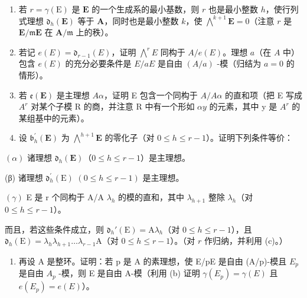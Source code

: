 \begin{enumerate}
\def\labelenumi{(\alph{enumi})}
\item
  若 \(r = \gamma(\mathrm{E})\) 是 \(\mathbf{E}\) 的一个生成系的最小基数，则 \(r\) 也是最小整数 \(h\)，使行列式理想 \(\mathfrak{d}_h(\mathbf{E})\) 等于 \(\mathbf{A}\)，同时也是最小整数 \(k\)，使 \(\bigwedge^{k+1} \mathbf{E} = 0\)（注意 \(r\) 是 \(\mathbf{E}/\mathfrak{m}\mathbf{E}\) 在 \(\mathbf{A}/\mathfrak{m}\) 上的秩）。
\item
  若记 \(e(E) = \mathfrak{d}_{r-1}(E)\)，证明 \(\bigwedge^{r} E\) 同构于 \(A / e(E)\)。理想 \(a\)（在 \(A\) 中）包含 \(e(E)\) 的充分必要条件是 \(E / aE\) 是自由 \((A / a)\) -模（归结为 \(a = 0\) 的情形）。
\item
  若 \(\mathfrak{e}(\mathbf{E})\) 是主理想 \(A\alpha\)，证明 E 包含一个同构于 \(A/A\alpha\) 的直和项（把 E 写成 \(A^{r}\) 对某个子模 R 的商，并注意 R 中有一个形如 \(\alpha y\) 的元素，其中 y 是 \(A^{r}\) 的某组基中的元素）。
\item
  设 \(\mathfrak{b}_h^{\prime}(\mathbf{E})\) 为 \(\bigwedge^{h+1}\mathbf{E}\) 的零化子（对 \(0 \leqslant h \leqslant r - 1\)）。证明下列条件等价：
\end{enumerate}

\((\alpha)\) 诸理想 \(\mathfrak{d}_h(\mathbf{E})\)（\(0 \leqslant h \leqslant r - 1\)）是主理想。

(β) 诸理想 \(\mathfrak{d}_h^\prime (\mathrm{E})\) \((0\leqslant h\leqslant r - 1)\) 是主理想。

\((\gamma)\) E 是 r 个同构于 A/A \(\lambda_{h}\) 的模的直和，其中 \(\lambda_{h+1}\) 整除 \(\lambda_{h}\)（对 \(0 \leqslant h \leqslant r - 1\)）。

而且，若这些条件成立，则 \(\mathfrak{d}_h'(\mathrm{E}) = \mathrm{A}\lambda_h\)（对 \(0 \leqslant h \leqslant r - 1\)），且 \(\mathfrak{d}_h(\mathrm{E}) = \lambda_h\lambda_{h+1} \ldots \lambda_{r-1}\mathrm{A}\)（对 \(0 \leqslant h \leqslant r - 1\)）。（对 \(r\) 作归纳，并利用 (c)。）

\begin{enumerate}
\def\labelenumi{(\alph{enumi})}
\setcounter{enumi}{4}
\tightlist
\item
  再设 A 是整环。证明：若 p 是 A 的素理想，使 E/pE 是自由 (A/p)-模且 \(E_{p}\) 是自由 \(A_{p}\) -模，则 E 是自由 A-模（利用 (b) 证明 \(\gamma(E_{p}) = \gamma(E)\) 且 \(e(E_{p}) = e(E)\)）。
\end{enumerate}


